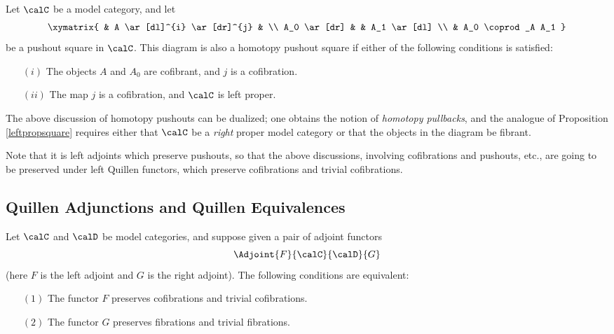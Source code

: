 \begin{Model Categories}
\begin{Already Read}
\begin{proposition}\label{leftpropsquare}
Let $\calC$ be a model category, and let
$$ \xymatrix{ & A \ar[dl]^{i} \ar[dr]^{j} & \\
A_0 \ar[dr] & & A_1 \ar[dl] \\
& A_0 \coprod_A A_1 } $$
be a pushout square in $\calC$. This diagram is also a homotopy pushout square if
either of the following conditions is satisfied:
\begin{itemize}
\item[$(i)$] The objects $A$ and $A_0$ are cofibrant, and $j$ is a cofibration.
\item[$(ii)$] The map $j$ is a cofibration, and $\calC$ is left proper.
\end{itemize}
\end{proposition}

\begin{remark}
The above discussion of homotopy pushouts can be dualized; one obtains the notion of {\it homotopy pullbacks}, and the analogue of Proposition \ref{leftpropsquare} requires either that $\calC$ be a {\em right} proper model category or that the objects in the diagram be fibrant.
\end{remark}
\begin{shaded}
Note that it is left adjoints which preserve pushouts, so that the above discussions, involving cofibrations and pushouts, etc., are going to be preserved under left Quillen functors, which preserve cofibrations and trivial cofibrations.
\end{shaded}

\subsection{Quillen Adjunctions and Quillen Equivalences}\label{quilladj}

Let $\calC$ and $\calD$ be model categories, and suppose given a pair of adjoint functors
$$ \Adjoint{F}{\calC}{\calD}{G} $$
(here $F$ is the left adjoint and $G$ is the right adjoint). The following conditions are equivalent:

\begin{itemize}
\item[$(1)$] The functor $F$ preserves cofibrations and trivial cofibrations.

\item[$(2)$] The functor $G$ preserves fibrations and trivial fibrations.


\end{itemize}
\end{Already Read}
\end{Model Categories}
